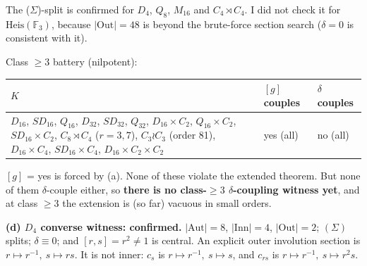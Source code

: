 \documentclass[11pt]{article}
\newcommand{\Inn}{\mathrm{Inn}}
\newcommand{\Out}{\mathrm{Out}}
\newcommand{\Aut}{\mathrm{Aut}}
\begin{document}
The (\(\Sigma\))-split is confirmed for $D_4$, $Q_8$, $M_{16}$ and $C_4\rtimes C_4$. I did not check it for $\mathrm{Heis}(\mathbb F_3)$, because $|\Out|=48$ is beyond the
brute-force section search ($\delta=0$ is consistent with it).

Class $\ge3$ battery (nilpotent):
\begin{center}\small
\begin{tabular}{p{}ll}
\toprule
$K$ & $[g]$ couples & $\delta$ couples\\
\midrule
$D_{16}$, $SD_{16}$, $Q_{16}$, $D_{32}$, $SD_{32}$, $Q_{32}$, $D_{16}\times C_2$, $Q_{16}\times C_2$, $SD_{16}\times C_2$,
$C_8\rtimes C_4$ ($r=3,7$), $C_3\wr C_3$ (order 81), $D_{16}\times C_4$, $SD_{16}\times C_4$, $D_{16}\times C_2\times C_2$ & yes (all) & no (all)\\
\bottomrule
\end{tabular}
\end{center}
$[g]$ = yes is forced by (a). None of these violate the extended theorem. But none of them $\delta$-couple either, so \textbf{there is no class-$\ge3$ $\delta$-coupling
witness yet}, and at class $\ge3$ the extension is (so far) vacuous in small orders.

\textbf{(d) $D_4$ converse witness: confirmed.} $|\Aut|=8$, $|\Inn|=4$, $|\Out|=2$; $(\Sigma)$ splits; $\delta\equiv0$; and $[r,s]=r^2\ne1$ is central.
An explicit outer involution section is $r\mapsto r^{-1},\ s\mapsto rs$. It is not inner: $c_s$ is $r\mapsto r^{-1},\ s\mapsto s$, and $c_{rs}$ is
$r\mapsto r^{-1},\ s\mapsto r^2s$.
\end{document}
